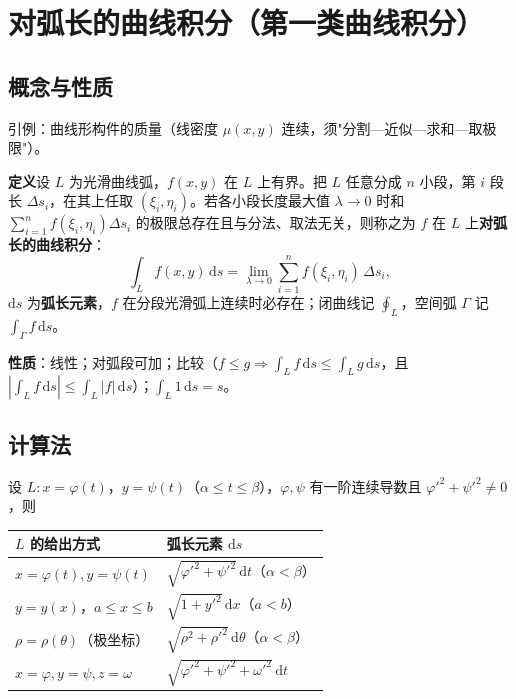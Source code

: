 
\section{对弧长的曲线积分（第一类曲线积分）}
\subsection{概念与性质}

引例：曲线形构件的质量（线密度 $\mu(x,y)$ 连续，须"分割—近似—求和—取极限"）。

\textbf{定义}\quad 设 $L$ 为光滑曲线弧，$f(x,y)$ 在 $L$ 上有界。把 $L$ 任意分成 $n$ 小段，第 $i$ 段长 $\Delta s_i$，在其上任取 $(\xi_i,\eta_i)$。若各小段长度最大值 $\lambda\to0$ 时和 $\sum\limits_{i=1}^{n}f(\xi_i,\eta_i)\Delta s_i$ 的极限总存在且与分法、取法无关，则称之为 $f$ 在 $L$ 上\textbf{对弧长的曲线积分}：
\[
\int_L f(x,y)\,\mathrm{d}s=\lim_{\lambda\to0}\sum_{i=1}^{n}f(\xi_i,\eta_i)\,\Delta s_i ,
\]
$\mathrm{d}s$ 为\textbf{弧长元素}，$f$ 在分段光滑弧上连续时必存在；闭曲线记 $\oint_L$，空间弧 $\Gamma$ 记 $\int_\Gamma f\,\mathrm{d}s$。

\textbf{性质}：线性；对弧段可加；比较（$f\le g\Rightarrow\int_Lf\,\mathrm{d}s\le\int_Lg\,\mathrm{d}s$，且 $\left|\int_Lf\,\mathrm{d}s\right|\le\int_L|f|\,\mathrm{d}s$）；$\int_L1\,\mathrm{d}s=s$。

\subsection{计算法}

设 $L:x=\varphi(t)$，$y=\psi(t)$（$\alpha\le t\le\beta$），$\varphi,\psi$ 有一阶连续导数且 $\varphi'^2+\psi'^2\ne0$，则
\begin{center}
\begin{tabular}{@{}ll@{}}
\toprule
$L$ 的给出方式 & 弧长元素 $\mathrm{d}s$ \\
\midrule
$x=\varphi(t),y=\psi(t)$ & $\sqrt{\varphi'^2+\psi'^2}\,\mathrm{d}t$（$\alpha<\beta$） \\
$y=y(x)$，$a\le x\le b$ & $\sqrt{1+y'^2}\,\mathrm{d}x$（$a<b$） \\
$\rho=\rho(\theta)$（极坐标） & $\sqrt{\rho^2+\rho'^2}\,\mathrm{d}\theta$（$\alpha<\beta$） \\
$x=\varphi,y=\psi,z=\omega$ & $\sqrt{\varphi'^2+\psi'^2+\omega'^2}\,\mathrm{d}t$ \\
\bottomrule
\end{tabular}
\end{center}

